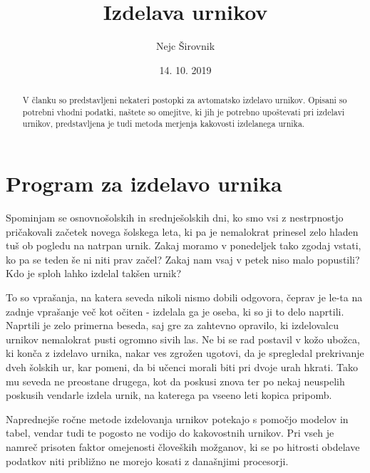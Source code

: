 \documentclass[a4paper,10pt]{article}
\begin{document}
\maketitle
\title{Izdelava urnikov}
\author{Nejc Širovnik}
\date{14. 10. 2019}

\begin{abstract}
   V članku so predstavljeni nekateri postopki za avtomatsko izdelavo urnikov. Opisani so
potrebni vhodni podatki, naštete so omejitve, ki jih je potrebno upoštevati pri izdelavi
urnikov, predstavljena je tudi metoda merjenja kakovosti izdelanega urnika.
\end{abstract}

\section{Program za izdelavo urnika} %

Spominjam se osnovnošolskih in srednješolskih dni, ko smo vsi z nestrpnostjo pričakovali
začetek novega šolskega leta, ki pa je nemalokrat prinesel zelo hladen tuš ob pogledu na
natrpan urnik. Zakaj moramo v ponedeljek tako zgodaj vstati, ko pa se teden še ni niti
prav začel? Zakaj nam vsaj v petek niso malo popustili? Kdo je sploh lahko izdelal
takšen urnik?

To so vprašanja, na katera seveda nikoli nismo dobili odgovora, čeprav je le-ta na zadnje
vprašanje več kot očiten - izdelala ga je oseba, ki so ji to delo naprtili. Naprtili je
zelo primerna beseda, saj gre za zahtevno opravilo, ki izdelovalcu urnikov nemalokrat
pusti ogromno sivih las. Ne bi se rad postavil v kožo ubožca, ki konča z izdelavo urnika,
nakar ves zgrožen ugotovi, da je spregledal prekrivanje dveh šolskih ur, kar pomeni, da
bi učenci morali biti pri dvoje urah hkrati. Tako mu seveda ne preostane drugega, kot da
poskusi znova ter po nekaj neuspelih poskusih vendarle izdela urnik, na katerega pa vseeno
leti kopica pripomb.

Naprednejše ročne metode izdelovanja urnikov potekajo s pomočjo modelov in tabel, vendar
tudi te pogosto ne vodijo do kakovostnih urnikov. Pri vseh je namreč prisoten faktor
omejenosti človeških možganov, ki se po hitrosti obdelave podatkov niti približno ne
morejo kosati z današnjimi procesorji.
\end{document}
